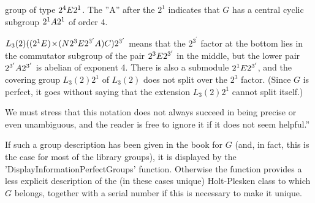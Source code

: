 {{      group  of type   $2^4 {\sl E} 2^1$.   The   ''A''  after the  $2^1$
      indicates that $G$ has a  central cyclic subgroup $2^1 {\sl A} 2^1$
      of order 4.
\item[(iii)]     $L_3(2) ((2^1 {\sl E}) \! \times \! ({\sl N} 2^3 {\sl E}
      2^{3^\prime} {\sl A}) {\sl C}) 2^{3^\prime}$    means   that    the
      $2^{3^\prime}$ factor at the bottom lies in the commutator subgroup
      of the pair $2^3 {\sl E} 2^{3^\prime}$ in the middle, but the lower
      pair $2^{3^\prime} {\sl A} 2^{3^\prime}$  is abelian of exponent 4.
      There  is  also  a submodule  $2^1 {\sl E} 2^{3^\prime}$,  and  the
      covering group  $L_3(2) 2^1$  of  $L_3(2)$  does not split over the
      $2^3$  factor.  (Since $G$ is perfect,  it goes without saying that
      the extension $L_3(2) 2^1$ cannot split itself.)
\par}

We  must  stress  that this  notation does   not  always succeed in being
precise  or even unambiguous, and the  reader is free to  ignore it if it
does not seem helpful.'' }

If such a group description has  been given in  the book for $G$ (and, in
fact, this is the case for  most of the library  groups), it is displayed
by the 'DisplayInformationPerfectGroups' function. Otherwise the function
provides a less explicit  description  of  the  (in these cases   unique)
Holt-Plesken class to which $G$ belongs, together with a serial number if
this is necessary to make it unique.


